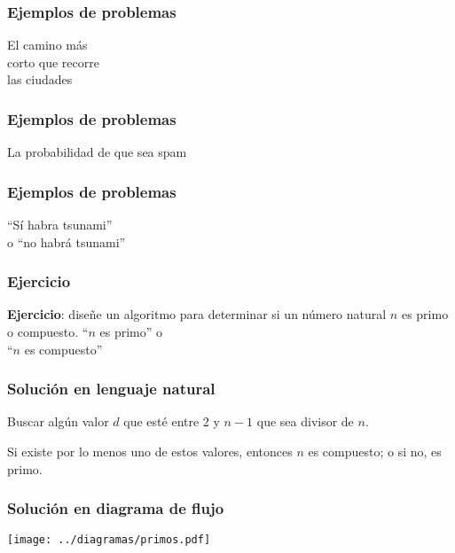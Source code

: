 \documentclass[12pt]{beamer}
\begin{document}
  \begin{frame}
    \frametitle{Ejemplos de problemas}
    \label{problema-ciudades}
             {El camino más \\ corto que recorre \\ las ciudades}
  \end{frame}

  \begin{frame}
    \frametitle{Ejemplos de problemas}
    \label{problema-spam}
             {La probabilidad de que sea spam}
  \end{frame}

  \begin{frame}
    \frametitle{Ejemplos de problemas}
    \label{problema-tsunami}
             {``Sí habra tsunami'' \\ o ``no habrá tsunami''}
  \end{frame}

  \begin{frame}
    \frametitle{Ejercicio}
    \label{ejercicio}
    \textbf{Ejercicio}: diseñe un algoritmo para determinar si un número natural \(n\)
    es primo o compuesto.
    \vfill
             {``\(n\) es primo'' o \\ ``\(n\) es compuesto''}
  \end{frame}

  \begin{frame}
    \frametitle{Solución en lenguaje natural}
    \label{sol-natural}
    Buscar algún valor \(d\)
    que esté entre 2 y \(n - 1\)
    que sea divisor de \(n\).

    Si existe por lo menos uno de estos valores,
    entonces \(n\) es compuesto;
    o si no, es primo.
  \end{frame}

  \begin{frame}
    \frametitle{Solución en diagrama de flujo}
    \label{sol-diagrama}
    \texttt{[image: ../diagramas/primos.pdf]}
  \end{frame}
\end{document}
